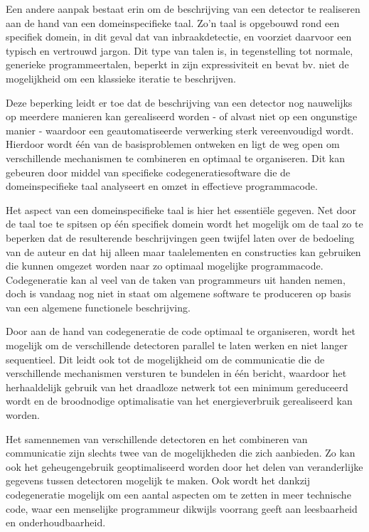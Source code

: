 \documentclass[DIV=calc,paper=a4,fontsize=11pt,twocolumn]{scrartcl}
\begin{document}
Een andere aanpak bestaat erin om de beschrijving van een detector te
realiseren aan de hand van een domeinspecifieke taal. Zo'n taal is opgebouwd
rond een specifiek domein, in dit geval dat van inbraakdetectie, en voorziet
daarvoor een typisch en vertrouwd jargon. Dit type van talen is, in
tegenstelling tot normale, generieke programmeertalen, beperkt in zijn
expressiviteit en bevat bv. niet de mogelijkheid om een klassieke iteratie te
beschrijven.

Deze beperking leidt er toe dat de beschrijving van een detector nog nauwelijks
op meerdere manieren kan gerealiseerd worden - of alvast niet op een ongunstige
manier - waardoor een geautomatiseerde verwerking sterk vereenvoudigd wordt.
Hierdoor wordt \'e\'en van de basisproblemen ontweken en ligt de weg open om
verschillende mechanismen te combineren en optimaal te organiseren. Dit kan
gebeuren door middel van specifieke codegeneratiesoftware die de
domeinspecifieke taal analyseert en omzet in effectieve programmacode.

Het aspect van een domeinspecifieke taal is hier het essenti\"ele gegeven. Net
door de taal toe te spitsen op \'e\'en specifiek domein wordt het mogelijk om
de taal zo te beperken dat de resulterende beschrijvingen geen twijfel laten
over de bedoeling van de auteur en dat hij alleen maar taalelementen en
constructies kan gebruiken die kunnen omgezet worden naar zo optimaal mogelijke
programmacode. Codegeneratie kan al veel van de taken van programmeurs uit
handen nemen, doch is vandaag nog niet in staat om algemene software te
produceren op basis van een algemene functionele beschrijving.

Door aan de hand van codegeneratie de code optimaal te organiseren, wordt het
mogelijk om de verschillende detectoren parallel te laten werken en niet langer
sequentieel. Dit leidt ook tot de mogelijkheid om de communicatie die de
verschillende mechanismen versturen te bundelen in \'e\'en bericht, waardoor
het herhaaldelijk gebruik van het draadloze netwerk tot een minimum gereduceerd
wordt en de broodnodige optimalisatie van het energieverbruik gerealiseerd kan
worden.

Het samennemen van verschillende detectoren en het combineren van communicatie
zijn slechts twee van de mogelijkheden die zich aanbieden. Zo kan ook het
geheugengebruik geoptimaliseerd worden door het delen van veranderlijke
gegevens tussen detectoren mogelijk te maken. Ook wordt het dankzij
codegeneratie mogelijk om een aantal aspecten om te zetten in meer technische
code, waar een menselijke programmeur dikwijls voorrang geeft aan leesbaarheid
en onderhoudbaarheid.
\end{document}
